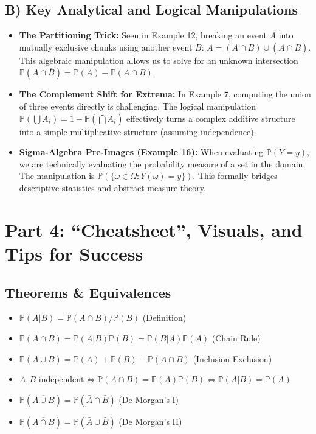 \documentclass[12pt, a4paper]{article}
\theoremstyle{definition}
\theoremstyle{remark}
\newcommand{\Prob}{\mathbb{P}}
\newcommand{\W}{\Omega}
\newcommand{\1}{\mathbf{1}}
\begin{document}
\subsection{B) Key Analytical and Logical Manipulations}
\begin{itemize}
    \item \textbf{The Partitioning Trick:} Seen in Example 12, breaking an event $A$ into mutually exclusive chunks using another event $B$: $A = (A \cap B) \cup (A \cap \bar{B})$. This algebraic manipulation allows us to solve for an unknown intersection $\Prob(A \cap \bar{B}) = \Prob(A) - \Prob(A \cap B)$.
    \item \textbf{The Complement Shift for Extrema:} In Example 7, computing the union of three events directly is challenging. The logical manipulation $\Prob(\bigcup A_i) = 1 - \Prob(\bigcap \bar{A}_i)$ effectively turns a complex additive structure into a simple multiplicative structure (assuming independence).
    \item \textbf{Sigma-Algebra Pre-Images (Example 16):} When evaluating $\Prob(Y=y)$, we are technically evaluating the probability measure of a set in the domain. The manipulation is $\Prob(\{\omega \in \W : Y(\omega) = y\})$. This formally bridges descriptive statistics and abstract measure theory.
\end{itemize}

\newpage

\section{Part 4: ``Cheatsheet'', Visuals, and Tips for Success}

\subsection{Theorems \& Equivalences}
\begin{itemize}
    \item $\Prob(A|B) = \Prob(A \cap B)/\Prob(B)$ \quad (Definition)
    \item $\Prob(A \cap B) = \Prob(A|B)\Prob(B) = \Prob(B|A)\Prob(A)$ \quad (Chain Rule)
    \item $\Prob(A \cup B) = \Prob(A) + \Prob(B) - \Prob(A \cap B)$ \quad (Inclusion-Exclusion)
    \item $A, B \text{ independent} \iff \Prob(A \cap B) = \Prob(A)\Prob(B) \iff \Prob(A|B) = \Prob(A)$
    \item $\Prob(\overline{A \cup B}) = \Prob(\bar{A} \cap \bar{B})$ \quad (De Morgan's I)
    \item $\Prob(\overline{A \cap B}) = \Prob(\bar{A} \cup \bar{B})$ \quad (De Morgan's II)
\end{itemize}
\end{document}
